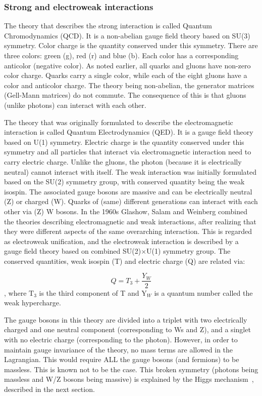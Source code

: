 \subsubsection{Strong and electroweak interactions}
The theory that describes the strong interaction is called Quantum Chromodynamics (QCD). It is a non-abelian gauge field theory based on SU(3) symmetry. Color charge is the quantity conserved under this symmetry. There are three colors: green (g), red (r) and blue (b). Each color has a corresponding anticolor (negative color). As noted earlier, all quarks and gluons have non-zero color charge. Quarks carry a single color, while each of the eight gluons have a color and anticolor charge. The theory being non-abelian, the generator matrices (Gell-Mann matrices) do not commute. The consequence of this is that gluons (unlike photons) can interact with each other.

The theory that was originally formulated to describe the electromagnetic interaction is called Quantum Electrodynamics (QED). It is a gauge field theory based on U(1) symmetry. Electric charge is the quantity conserved under this symmetry and all particles that interact via electromagnetic interaction need to carry electric charge. Unlike the gluons, the photon (because it is electrically neutral) cannot interact with itself. The weak interaction was initially formulated based on the SU(2) symmetry group, with conserved quantity being the weak isospin. The associated gauge bosons are massive and can be electrically neutral (Z) or charged (W). Quarks of (same) different generations can interact with each other via (Z) W bosons. In the 1960s Glashow, Salam and Weinberg combined the theories describing electromagnetic and weak interactions, after realizing that they were different aspects of the same overarching interaction. This is regarded as electroweak unification, and the electroweak interaction is described by a gauge field theory based on combined SU(2)$\times$U(1) symmetry group. The conserved quantities, weak isospin (T) and electric charge (Q) are related via:

\begin{equation}
  Q = T_{3} + \frac{Y_{W}}{2}
\end{equation}
, where $\mathrm{T}_{3}$ is the third component of T and $\mathrm{Y}_{W}$ is a quantum number called the weak hypercharge.

The gauge bosons in this theory are divided into a triplet with two electrically charged and one neutral component (corresponding to Ws and Z), and a singlet with no electric charge (corresponding to the photon). However, in order to maintain gauge invariance of the theory, no mass terms are allowed in the Lagrangian. This would require ALL the gauge bosons (and fermions) to be massless. This is known not to be the case. This broken symmetry (photons being massless and W/Z bosons being massive) is explained by the Higgs mechanism~\cite{Englert:1964et,Higgs:1964ia,Higgs:1964pj,Guralnik:1964eu}, described in the next section.

